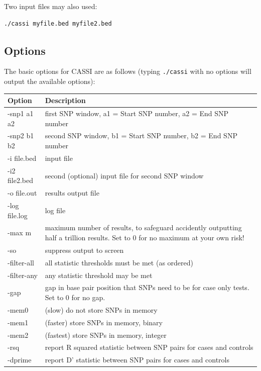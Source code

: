 \documentclass[a4paper,12pt]{article}
\newcommand{\code}[1]{{\footnotesize{{\tt #1}}}}
\begin{document}
Two input files may also used: 
\vspace{0.35cm} \begin{lstlisting}
./cassi myfile.bed myfile2.bed

\end{lstlisting} \vspace{0.35cm}

\subsection{Options}
\label{basic-options}

The basic options for CASSI are as follows (typing \code{./cassi} with no options will output the available options): 

{\begin{center}\begin{tabular}{ll}
Option  & Description\\
\hline
-snp1 a1 a2  & first SNP window, a1 = Start SNP number, a2 = End SNP number\\
-snp2 b1 b2  & second SNP window, b1 = Start SNP number, b2 = End SNP number\\
-i file.bed  & input file\\
-i2 file2.bed  & second (optional) input file for second SNP window\\
-o file.out  & results output file\\
-log file.log  & log file\\
-max m  & maximum number of results, to safeguard accidently outputting half a trillion results. Set to 0 for no maximum at your own risk!\\
-so  & suppress output to screen\\
-filter-all  & all statistic thresholds must be met (as ordered)\\
-filter-any  & any statistic threshold may be met\\
-gap  & gap in base pair position that SNPs need to be for case only tests. Set to 0 for no gap.\\
-mem0  & (slow) do not store SNPs in memory\\
-mem1  & (faster) store SNPs in memory, binary\\
-mem2  & (fastest) store SNPs in memory, integer\\
-rsq  & report R squared statistic between SNP pairs for cases and controls\\
-dprime  & report D' statistic between SNP pairs for cases and controls\\
\end{tabular}\end{center}}
\end{document}
